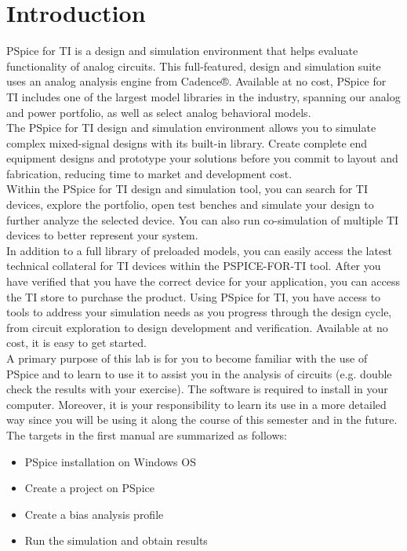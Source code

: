 
\section{Introduction}
PSpice for TI is a design and simulation environment that helps evaluate functionality of analog circuits. This full-featured, design and simulation suite uses an analog analysis engine from Cadence®. Available at no cost, PSpice for TI includes one of the largest model libraries in the industry, spanning our analog and power portfolio, as well as select analog behavioral models.\\

The PSpice for TI design and simulation environment allows you to simulate complex mixed-signal designs with its built-in library. Create complete end equipment designs and prototype your solutions before you commit to layout and fabrication, reducing time to market and development cost. \\

Within the PSpice for TI design and simulation tool, you can search for TI devices, explore the portfolio, open test benches and simulate your design to further analyze the selected device. You can also run co-simulation of multiple TI devices to better represent your system.\\

In addition to a full library of preloaded models, you can easily access the latest technical collateral for TI devices within the PSPICE-FOR-TI tool. After you have verified that you have the correct device for your application, you can access the TI store to purchase the product. Using PSpice for TI, you have access to tools to address your simulation needs as you progress through the design cycle, from circuit exploration to design development and verification. Available at no cost, it is easy to get started.\\

A primary purpose of this lab is for you to become familiar with the use of PSpice and to learn to use it to assist you in the analysis of circuits (e.g. double check the results with your exercise). The software is required to  install in your computer. Moreover, it is your responsibility to learn its use in a more detailed way since you will be using it along the course of this semester and in the future.
The targets in the first manual are summarized as follows:
\begin{itemize}
    \item PSpice installation on Windows OS
    \item Create a project on PSpice
    \item Create a bias analysis profile
    \item Run the simulation and obtain results
\end{itemize}
\newpage
